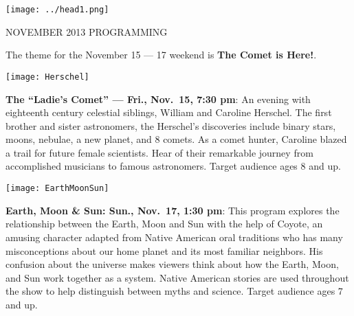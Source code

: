 \documentclass{article}
\begin{document}
\texttt{[image: ../head1.png]}
   {\fontsize{30}{40}
   \begin{centering}
   NOVEMBER 2013 PROGRAMMING

   \end{centering}
   
   }

\begin{multicols}{2}

   {\fontsize{18}{20}

   The theme for the November 15 — 17 weekend is \textbf{The Comet is Here!}.

}

   \vskip 0.4cm

   \begin{floatingfigure}{2in}
      \texttt{[image: Herschel]}
   \end{floatingfigure}      

   \textbf{The “Ladie’s Comet” — Fri., Nov.~15, 7:30 pm}:
   An evening with eighteenth century celestial siblings, William and Caroline Herschel. The first brother and sister astronomers, the Herschel’s discoveries include binary stars, moons, nebulae, a new planet, and 8 comets. As a comet hunter, Caroline blazed a trail for future female scientists. Hear of their remarkable journey from accomplished musicians to famous astronomers. Target audience ages 8 and up.

   \vskip 0.4cm

   \texttt{[image: EarthMoonSun]}

   \textbf{Earth, Moon \& Sun: Sun., Nov.~17, 1:30 pm}:
   This program explores the relationship between the Earth, Moon and Sun with the help of Coyote, an amusing character adapted from Native American oral traditions who has many misconceptions about our home planet and its most familiar neighbors. His confusion about the universe makes viewers think about how the Earth, Moon, and Sun work together as a system. Native American stories are used throughout the show to help distinguish between myths and science. Target audience ages 7 and up.

\columnbreak



   {\fontsize{18}{20}

}
\end{multicols}
\end{document}
